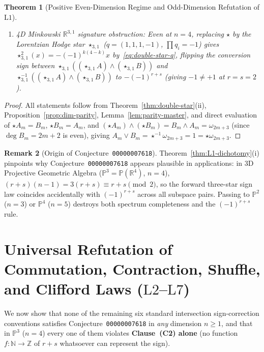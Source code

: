 \documentclass[11pt]{article}
\newtheorem{theorem}{Theorem}[section]
\theoremstyle{definition}
\newtheorem{remark}[theorem]{Remark}
\newcommand{\Proj}{\mathbb{P}}
\newcommand{\Z}{\mathbb{Z}}
\newcommand{\R}{\mathbb{R}}
\begin{document}
\begin{theorem}[Positive Even-Dimension Regime and Odd-Dimension Refutation of $\mathrm{L1}$]
\begin{enumerate}
\item \emph{4D Minkowski $\R^{3,1}$ signature obstruction:} Even at $n = 4$, replacing $\star$ by the Lorentzian Hodge star $\star_{3,1}$ ($q = (1,1,1,-1)$, $\prod q_i = -1$) gives $\star_{3,1}^2(x) = -(-1)^{k(4-k)} x$ by~\eqref{eq:double-star-q}, flipping the conversion sign between $\star_{3,1}((\star_{3,1} A) \wedge (\star_{3,1} B))$ and $\star_{3,1}^{-1}((\star_{3,1} A) \wedge (\star_{3,1} B))$ to $-(-1)^{r+s}$ (giving $-1 \neq +1$ at $r = s = 2$).
\end{enumerate}
\end{theorem}
\begin{proof}
All statements follow from Theorem~\ref{thm:double-star}(ii), Proposition~\ref{prop:dim-parity}, Lemma~\ref{lem:parity-master}, and direct evaluation of $\star A_m = B_m$, $\star B_m = A_m$, and $(\star A_m) \wedge (\star B_m) = B_m \wedge A_m = \omega_{2m+3}$ (since $\deg B_m = 2m + 2$ is even), giving $A_m \vee B_m = \star^{-1}\omega_{2m+3} = 1 = \star\omega_{2m+3}$.
\end{proof}

\begin{remark}[Origin of Conjecture~\texttt{00000007618}]
Theorem~\ref{thm:L1-dichotomy}(i) pinpoints why Conjecture~\texttt{00000007618} appears plausible in applications: in 3D Projective Geometric Algebra ($\Proj^3 = \Proj(\R^4)$, $n = 4$), $(r+s)(n-1) = 3(r+s) \equiv r + s \pmod{2}$, so the forward three-star sign law coincides accidentally with $(-1)^{r+s}$ across all subspace pairs. Passing to $\Proj^2$ ($n = 3$) or $\Proj^4$ ($n = 5$) destroys both spectrum completeness and the $(-1)^{r+s}$ rule.
\end{remark}

\section{Universal Refutation of Commutation, Contraction, Shuffle, and Clifford Laws \texorpdfstring{($\mathrm{L2}$--$\mathrm{L7}$)}{(L2--L7)}}

We now show that none of the remaining six standard intersection sign-correction conventions satisfies Conjecture~\texttt{00000007618} in \emph{any} dimension $n \ge 1$, and that in $\Proj^3$ ($n = 4$) every one of them violates \textbf{Clause~(C2) alone} (no function $f : \mathbb{N} \to \Z$ of $r + s$ whatsoever can represent the sign).
\end{document}
